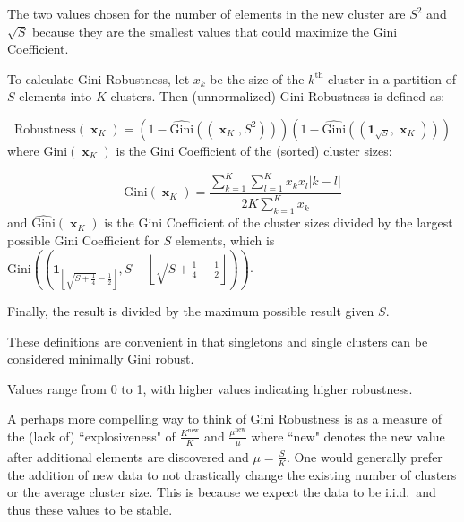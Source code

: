 \documentclass[8pt]{extarticle}
\newcommand{\x}[1]{\mathop{{}\mathbf{x}}\nolimits_{#1}}
\begin{document}
    The two values chosen for the number of elements in the new cluster are $S^2$ and $\sqrt{S} $ because they are the smallest values that could maximize the Gini Coefficient.

    To calculate Gini Robustness, let $x_k$ be the size of the $k^{\text{th}}$ cluster in a partition of $S$ elements into $K$ clusters.
    Then (unnormalized) Gini Robustness is defined as:

    \[\text{Robustness}(\x{K}) = \left(1 - \widehat{\text{Gini}}\left(\left(\x{K}, S^2\right)\right)\right) \left(1 - \widehat{\text{Gini}}\left(\left(\mathbf{1}_{\sqrt{S}}, \x{K}\right)\right)\right)\]
    where $\text{Gini}\left(\x{K}\right)$ is the Gini Coefficient of the (sorted) cluster sizes:

    \[\text{Gini}(\x{K}) = \frac{\sum_{k=1}^K\sum_{l=1}^Kx_k x_l |k-l|}{2K\sum_{k=1}^K x_k}\]
    and $\widehat{\text{Gini}}\left(\x{K}\right)$ is the Gini Coefficient of the cluster sizes divided by the largest possible Gini Coefficient for $S$ elements, which is
    $\text{Gini}\left(\left(\mathbf{1}_{\left\lfloor\sqrt{S+\frac{1}{4}}-\frac{1}{2}\right\rfloor}, S - \left\lfloor\sqrt{S+\frac{1}{4}}-\frac{1}{2}\right\rfloor\right)\right)$.

    Finally, the result is divided by the maximum possible result given $S$.

    These definitions are convenient in that singletons and single clusters can be considered minimally Gini robust.

    Values range from 0 to 1, with higher values indicating higher robustness.

    A perhaps more compelling way to think of Gini Robustness is as a measure of the (lack of) ``explosiveness" of $\frac{K^{\text{new}}}{K}$ and $\frac{\mu^{\text{new}}}{\mu}$ where ``new" denotes the new value after additional elements are discovered and $\mu=\frac{S}{K}$.
    One would generally prefer the addition of new data to not drastically change the existing number of clusters or the average cluster size.
    This is because we expect the data to be i.i.d.\ and thus these values to be stable.
\end{document}
